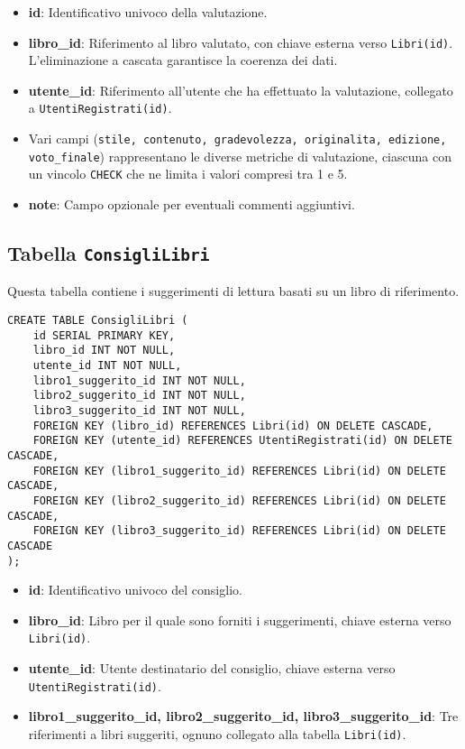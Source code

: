 \documentclass{report}
\begin{document}
\begin{itemize}
    \item \textbf{id}: Identificativo univoco della valutazione.
    \item \textbf{libro\_id}: Riferimento al libro valutato, con chiave esterna verso \texttt{Libri(id)}. L'eliminazione a cascata garantisce la coerenza dei dati.
    \item \textbf{utente\_id}: Riferimento all'utente che ha effettuato la valutazione, collegato a \texttt{UtentiRegistrati(id)}.
    \item Vari campi (\texttt{stile, contenuto, gradevolezza, originalita, edizione, voto\_finale}) rappresentano le diverse metriche di valutazione, ciascuna con un vincolo \texttt{CHECK} che ne limita i valori compresi tra 1 e 5.
    \item \textbf{note}: Campo opzionale per eventuali commenti aggiuntivi.
\end{itemize}

\subsection{Tabella \texttt{ConsigliLibri}}
Questa tabella contiene i suggerimenti di lettura basati su un libro di riferimento.

\begin{lstlisting}
CREATE TABLE ConsigliLibri (
    id SERIAL PRIMARY KEY,
    libro_id INT NOT NULL,
    utente_id INT NOT NULL,
    libro1_suggerito_id INT NOT NULL,
    libro2_suggerito_id INT NOT NULL,
    libro3_suggerito_id INT NOT NULL,
    FOREIGN KEY (libro_id) REFERENCES Libri(id) ON DELETE CASCADE,
    FOREIGN KEY (utente_id) REFERENCES UtentiRegistrati(id) ON DELETE CASCADE,
    FOREIGN KEY (libro1_suggerito_id) REFERENCES Libri(id) ON DELETE CASCADE,
    FOREIGN KEY (libro2_suggerito_id) REFERENCES Libri(id) ON DELETE CASCADE,
    FOREIGN KEY (libro3_suggerito_id) REFERENCES Libri(id) ON DELETE CASCADE
);
\end{lstlisting}

\begin{itemize}
    \item \textbf{id}: Identificativo univoco del consiglio.
    \item \textbf{libro\_id}: Libro per il quale sono forniti i suggerimenti, chiave esterna verso \texttt{Libri(id)}.
    \item \textbf{utente\_id}: Utente destinatario del consiglio, chiave esterna verso \texttt{UtentiRegistrati(id)}.
    \item \textbf{libro1\_suggerito\_id, libro2\_suggerito\_id, libro3\_suggerito\_id}: Tre riferimenti a libri suggeriti, ognuno collegato alla tabella \texttt{Libri(id)}.
\end{itemize}
\end{document}
